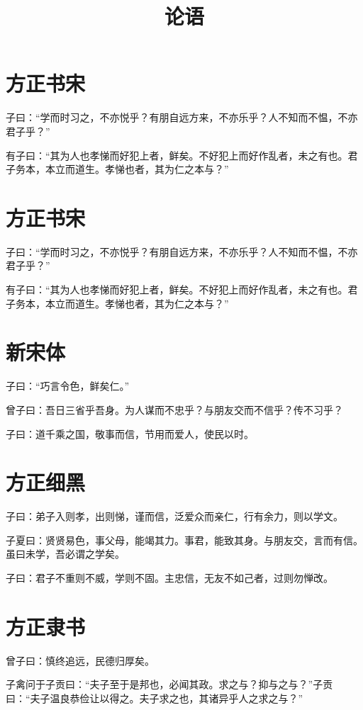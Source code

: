 \documentclass[10pt,letterpaper,twoside]{article}
\title{论语} \author{} \date{}
\begin{document}
\section{方正书宋}

    子曰：“学而时习之，不亦悦乎？有朋自远方来，不亦乐乎？人不知而不愠，不亦君子乎？”

    有子曰：“其为人也孝悌而好犯上者，鲜矣。不好犯上而好作乱者，未之有也。君子务本，本立而道生。孝悌也者，其为仁之本与？”


\section{方正书宋}

    子曰：“学而时习之，不亦悦乎？有朋自远方来，不亦乐乎？人不知而不愠，不亦君子乎？”

    有子曰：“其为人也孝悌而好犯上者，鲜矣。不好犯上而好作乱者，未之有也。君子务本，本立而道生。孝悌也者，其为仁之本与？”


\section{新宋体}
    子曰：“巧言令色，鲜矣仁。”

    曾子曰：吾日三省乎吾身。为人谋而不忠乎？与朋友交而不信乎？传不习乎？

    子曰：道千乘之国，敬事而信，节用而爱人，使民以时。

\section{方正细黑}

    子曰：弟子入则孝，出则悌，谨而信，泛爱众而亲仁，行有余力，则以学文。

    子夏曰：贤贤易色，事父母，能竭其力。事君，能致其身。与朋友交，言而有信。虽曰未学，吾必谓之学矣。

    子曰：君子不重则不威，学则不固。主忠信，无友不如己者，过则勿惮改。

\section{方正隶书}

    曾子曰：慎终追远，民德归厚矣。

    子禽问于子贡曰：“夫子至于是邦也，必闻其政。求之与？抑与之与？”子贡曰：“夫子温良恭俭让以得之。夫子求之也，其诸异乎人之求之与？”
\end{document}
